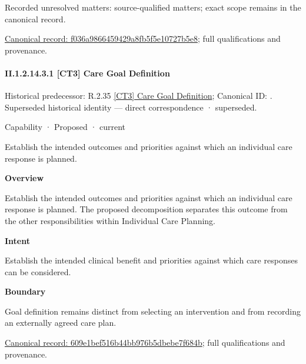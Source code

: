 {\small Recorded unresolved matters: source-qualified matters; exact scope remains in the canonical record.}\par
{\footnotesize \href{../../../../continuum/strategy/capability/f036a9866459429a8fb5f5e10727b5e8.md}{Canonical record: f036a9866459429a8fb5f5e10727b5e8}; full qualifications and provenance.}\par
\paragraph*{II.1.2.14.3.1 [CT3] Care Goal Definition}
\label{navigation:II.1.2.14.3.1}

{\small Historical predecessor: R.2.35 \hyperref[element:8bfbcc0a455d423c90ae2f1cfb732ca8]{[CT3] Care Goal Definition}; Canonical ID: \texttt{}. Superseded historical identity — direct correspondence · superseded.}\par
\label{element:609e1bef516b44bb976b5dbebe7f684b}
{\small Capability · Proposed · current}\par

Establish the intended outcomes and priorities against which an individual care response is planned.



\textbf{Overview}



Establish the intended outcomes and priorities against which an individual care response is planned. The proposed decomposition separates this outcome from the other responsibilities within Individual Care Planning.



\textbf{Intent}



Establish the intended clinical benefit and priorities against which care responses can be considered.



\textbf{Boundary}



Goal definition remains distinct from selecting an intervention and from recording an externally agreed care plan.


{\footnotesize \href{../../../../continuum/strategy/capability/609e1bef516b44bb976b5dbebe7f684b.md}{Canonical record: 609e1bef516b44bb976b5dbebe7f684b}; full qualifications and provenance.}\par
